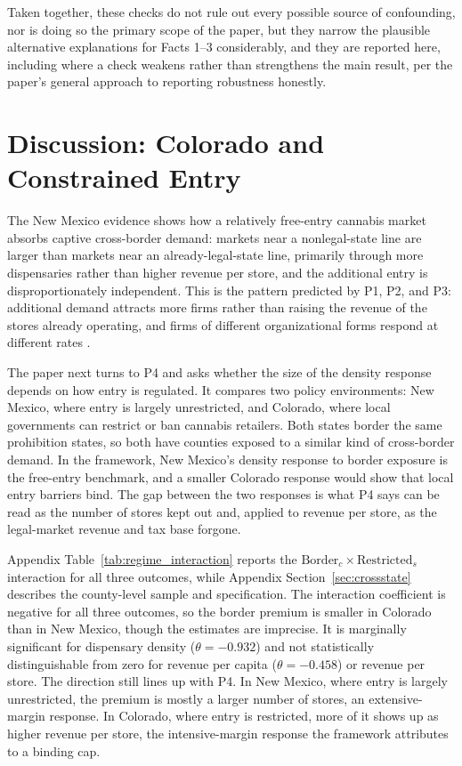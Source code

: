 \documentclass[english,12pt]{article}
\begin{document}
Taken together, these checks do not rule out every possible source of confounding, nor is doing so the primary scope of the paper, but they narrow the plausible alternative explanations for Facts 1--3 considerably, and they are reported here, including where a check weakens rather than strengthens the main result, per the paper's general approach to reporting robustness honestly.

\FloatBarrier

\section{Discussion: Colorado and Constrained Entry}
\label{sec:discussion}

The New Mexico evidence shows how a relatively free-entry cannabis market absorbs captive cross-border demand: markets near a nonlegal-state line are larger than markets near an already-legal-state line, primarily through more dispensaries rather than higher revenue per store, and the additional entry is disproportionately independent. This is the pattern predicted by P1, P2, and P3: additional demand attracts more firms rather than raising the revenue of the stores already operating, and firms of different organizational forms respond at different rates \citep{BresnahanReiss1991}.

The paper next turns to P4 and asks whether the size of the density response depends on how entry is regulated. It compares two policy environments: New Mexico, where entry is largely unrestricted, and Colorado, where local governments can restrict or ban cannabis retailers. Both states border the same prohibition states, so both have counties exposed to a similar kind of cross-border demand. In the framework, New Mexico's density response to border exposure is the free-entry benchmark, and a smaller Colorado response would show that local entry barriers bind. The gap between the two responses is what P4 says can be read as the number of stores kept out and, applied to revenue per store, as the legal-market revenue and tax base forgone.

Appendix Table~\ref{tab:regime_interaction} reports the $\text{Border}_c \times \text{Restricted}_s$ interaction for all three outcomes, while Appendix Section~\ref{sec:crossstate} describes the county-level sample and specification. The interaction coefficient is negative for all three outcomes, so the border premium is smaller in Colorado than in New Mexico, though the estimates are imprecise. It is marginally significant for dispensary density ($\theta=-0.932$) and not statistically distinguishable from zero for revenue per capita ($\theta=-0.458$) or revenue per store. The direction still lines up with P4. In New Mexico, where entry is largely unrestricted, the premium is mostly a larger number of stores, an extensive-margin response. In Colorado, where entry is restricted, more of it shows up as higher revenue per store, the intensive-margin response the framework attributes to a binding cap.
\end{document}
